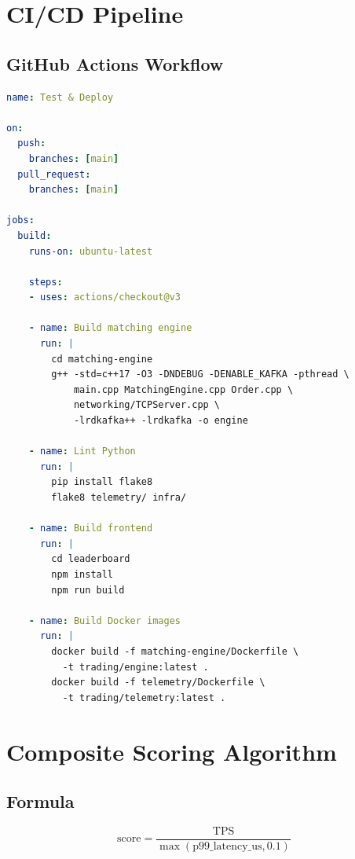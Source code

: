 \documentclass[10pt,a4paper,oneside]{report}
\begin{document}
\chapter{CI/CD Pipeline}

\section{GitHub Actions Workflow}

\begin{lstlisting}[language=yaml]
name: Test & Deploy

on:
  push:
    branches: [main]
  pull_request:
    branches: [main]

jobs:
  build:
    runs-on: ubuntu-latest

    steps:
    - uses: actions/checkout@v3

    - name: Build matching engine
      run: |
        cd matching-engine
        g++ -std=c++17 -O3 -DNDEBUG -DENABLE_KAFKA -pthread \
            main.cpp MatchingEngine.cpp Order.cpp \
            networking/TCPServer.cpp \
            -lrdkafka++ -lrdkafka -o engine

    - name: Lint Python
      run: |
        pip install flake8
        flake8 telemetry/ infra/

    - name: Build frontend
      run: |
        cd leaderboard
        npm install
        npm run build

    - name: Build Docker images
      run: |
        docker build -f matching-engine/Dockerfile \
          -t trading/engine:latest .
        docker build -f telemetry/Dockerfile \
          -t trading/telemetry:latest .
\end{lstlisting}

\chapter{Composite Scoring Algorithm}

\section{Formula}

\begin{equation}
\text{score} = \frac{\text{TPS}}{\max(\text{p99\_latency\_us}, 0.1)}
\end{equation}
\end{document}
